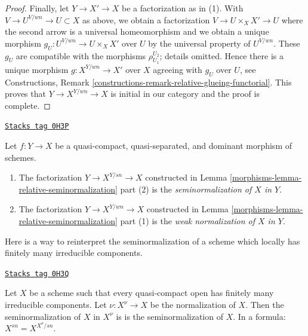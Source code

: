 \begin{proof}
\medskip\noindent
Finally, let $Y \to X' \to X$ be a factorization as in (1).
With $V \to U^{V/wn} \to U \subset X$ as above,
we obtain a factorization $V \to U \times_X X' \to U$ where
the second arrow is a universal homeomorphism
and we obtain a unique morphism $g_U : U^{V/wn} \to U \times_X X'$ over $U$
by the universal property of $U^{V/wn}$.
These $g_U$ are compatible with the morphisms $\rho_{U_1}^{U_2}$; details
omitted. Hence there is a unique morphism $g : X^{Y/wn} \to X'$
over $X$ agreeing with $g_U$ over $U$, see
Constructions, Remark \ref{constructions-remark-relative-glueing-functorial}.
This proves that $Y \to X^{Y/wn} \to X$ is initial in our category
and the proof is complete.
\end{proof}

\begin{definition}
\label{morphisms-definition-relative-seminormalization}
\href{https://stacks.math.columbia.edu/tag/0H3P}{\texttt{Stacks tag 0H3P}}

Let $f : Y \to X$ be a quasi-compact, quasi-separated, and dominant
morphism of schemes.
\begin{enumerate}
\item The factorization $Y \to X^{Y/sn} \to X$ constructed in
Lemma \ref{morphisms-lemma-relative-seminormalization} part (2)
is the {\it seminormalization of $X$ in $Y$}.
\item The factorization $Y \to X^{Y/wn} \to X$ constructed in
Lemma \ref{morphisms-lemma-relative-seminormalization} part (1)
is the {\it weak normalization of $X$ in $Y$}.
\end{enumerate}
\end{definition}

Here is a way to reinterpret the seminormalization of a scheme
which locally has finitely many irreducible components.

\begin{lemma}
\label{morphisms-lemma-seminormal-and-normalization}
\href{https://stacks.math.columbia.edu/tag/0H3Q}{\texttt{Stacks tag 0H3Q}}

Let $X$ be a scheme such that every quasi-compact open has
finitely many irreducible components. Let $\nu : X^\nu \to X$
be the normalization of $X$. Then the seminormalization of $X$ in
$X^\nu$ is is the seminormalization of $X$. In a formula:
$X^{sn} = X^{X^\nu/sn}$.
\end{lemma}

